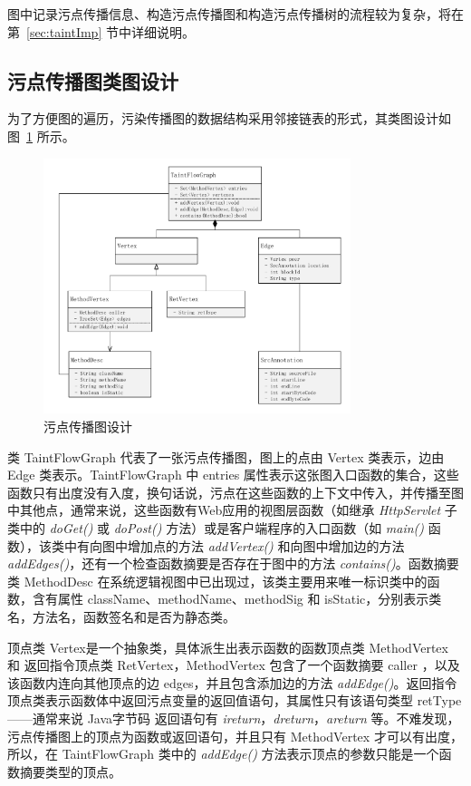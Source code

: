 图中记录污点传播信息、构造污点传播图和构造污点传播树的流程较为复杂，将在第~\ref{sec:taintImp} 节中详细说明。\\

\subsection{污点传播图类图设计}

为了方便图的遍历，污染传播图的数据结构采用邻接链表的形式，其类图设计如图~\ref{taintGraphClass} 所示。

\begin{figure}[!htb]
	\centering
	\includegraphics[width=0.8\textwidth]{FIGs/chapter3/taintGraphClass.pdf}
	\caption{污点传播图设计}\label{taintGraphClass}
\end{figure}

类 TaintFlowGraph 代表了一张污点传播图，图上的点由 Vertex 类表示，边由 Edge 类表示。TaintFlowGraph 中 entries 属性表示这张图入口函数的集合，这些函数只有出度没有入度，换句话说，污点在这些函数的上下文中传入，并传播至图中其他点，通常来说，这些函数有Web应用的视图层函数（如继承 \textit{HttpServlet} 子类中的 \textit{doGet()} 或 \textit{doPost()} 方法）或是客户端程序的入口函数（如 \textit{main()} 函数），该类中有向图中增加点的方法 \textit{addVertex()} 和向图中增加边的方法 \textit{addEdges()}，还有一个检查函数摘要是否存在于图中的方法 \textit{contains()}。函数摘要类 MethodDesc 在系统逻辑视图中已出现过，该类主要用来唯一标识类中的函数，含有属性 className、methodName、methodSig 和 isStatic，分别表示类名，方法名，函数签名和是否为静态类。

顶点类 Vertex是一个抽象类，具体派生出表示函数的函数顶点类 MethodVertex 和 返回指令顶点类 RetVertex，MethodVertex 包含了一个函数摘要 caller ，以及该函数内连向其他顶点的边 edges，并且包含添加边的方法 \textit{addEdge()}。返回指令顶点类表示函数体中返回污点变量的返回值语句，其属性只有该语句类型 retType——通常来说 Java字节码 返回语句有 \textit{ireturn}，\textit{dreturn}，\textit{areturn} 等。不难发现，污点传播图上的顶点为函数或返回语句，并且只有 MethodVertex 才可以有出度，所以，在 TaintFlowGraph 类中的 \textit{addEdge()} 方法表示顶点的参数只能是一个函数摘要类型的顶点。

